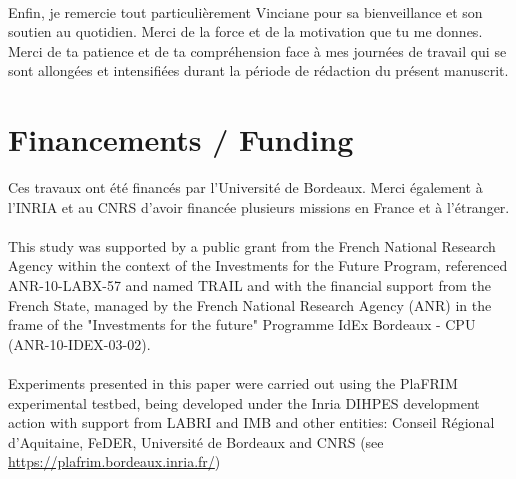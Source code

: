 \paragraph{}
Enfin, je remercie tout particulièrement Vinciane pour sa bienveillance et son soutien au quotidien. 
Merci de la force et de la motivation que tu me donnes. 
Merci de ta patience et de ta compréhension face à mes journées de travail qui se sont allongées et intensifiées durant la période de rédaction du présent manuscrit. 

\newpage
\section*{Financements / Funding}
Ces travaux ont été financés par l'Université de Bordeaux. 
Merci également à l'INRIA et au CNRS d'avoir financée plusieurs missions en France et à l'étranger.


\paragraph{}
This study was supported by a public grant from the French National Research
Agency within the context of the Investments for the Future Program, referenced ANR-10-LABX-57 and named TRAIL
and with the financial support from the French State, managed by the French National Research Agency (ANR) in the frame of the "Investments for the future" Programme IdEx Bordeaux - CPU (ANR-10-IDEX-03-02).


\paragraph{}
Experiments presented in this paper were carried out using the PlaFRIM experimental testbed,
being developed under the Inria DIHPES development action with support from LABRI and
IMB and other entities: Conseil Régional d’Aquitaine, FeDER, Université de Bordeaux and
CNRS (see \url{https://plafrim.bordeaux.inria.fr/})
